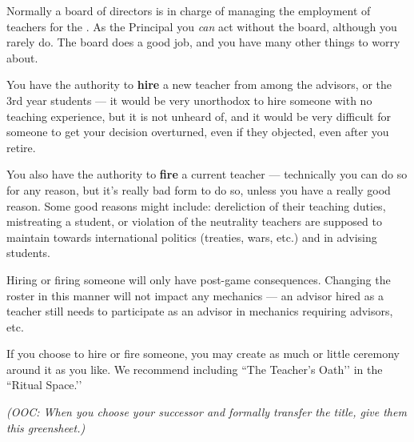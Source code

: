 \documentclass[green]{GL2020}
\begin{document}
\name{\gHireTeacher{}}

Normally a board of directors is in charge of managing the employment of teachers for the \pSchool{}. As the Principal you \emph{can} act without the board, although you rarely do. The board does a good job, and you have many other things to worry about.

You have the authority to \textbf{hire} a new teacher from among the advisors, or the 3rd year students — it would be very unorthodox to hire someone with no teaching experience, but it is not unheard of, and it would be very difficult for someone to get your decision overturned, even if they objected, even after you retire.

You also have the authority to \textbf{fire} a current teacher — technically you can do so for any reason, but it’s really bad form to do so, unless you have a really good reason. Some good reasons might include: dereliction of their teaching duties, mistreating a student, or violation of the neutrality teachers are supposed to maintain towards international politics (treaties, wars, etc.) and in advising students.

Hiring or firing someone will only have post-game consequences. Changing the roster in this manner will not impact any mechanics — an advisor hired as a teacher still needs to participate as an advisor in mechanics requiring advisors, etc.

If you choose to hire or fire someone, you may create as much or little ceremony around it as you like. We recommend including ``The Teacher’s Oath’’ in the ``Ritual Space.’’

\emph{(OOC: When you choose your successor and formally transfer the title, give them this greensheet.)}
\end{document}
